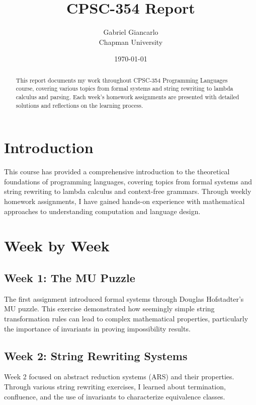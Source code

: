 \documentclass{article}
\title{CPSC-354 Report}
\author{Gabriel Giancarlo \\ Chapman University}
\date{\today}
\theoremstyle{plain}
\theoremstyle{definition}
\theoremstyle{remark}
\begin{document}
\maketitle

\begin{abstract}
This report documents my work throughout CPSC-354 Programming Languages course, covering various topics from formal systems and string rewriting to lambda calculus and parsing. Each week's homework assignments are presented with detailed solutions and reflections on the learning process.
\end{abstract}

\setcounter{tocdepth}{3}
\tableofcontents

\section{Introduction}\label{intro}

This course has provided a comprehensive introduction to the theoretical foundations of programming languages, covering topics from formal systems and string rewriting to lambda calculus and context-free grammars. Through weekly homework assignments, I have gained hands-on experience with mathematical approaches to understanding computation and language design.

\section{Week by Week}\label{homework}

\subsection{Week 1: The MU Puzzle}

The first assignment introduced formal systems through Douglas Hofstadter's MU puzzle. This exercise demonstrated how seemingly simple string transformation rules can lead to complex mathematical properties, particularly the importance of invariants in proving impossibility results.

\subsection{Week 2: String Rewriting Systems}

Week 2 focused on abstract reduction systems (ARS) and their properties. Through various string rewriting exercises, I learned about termination, confluence, and the use of invariants to characterize equivalence classes.
\end{document}
